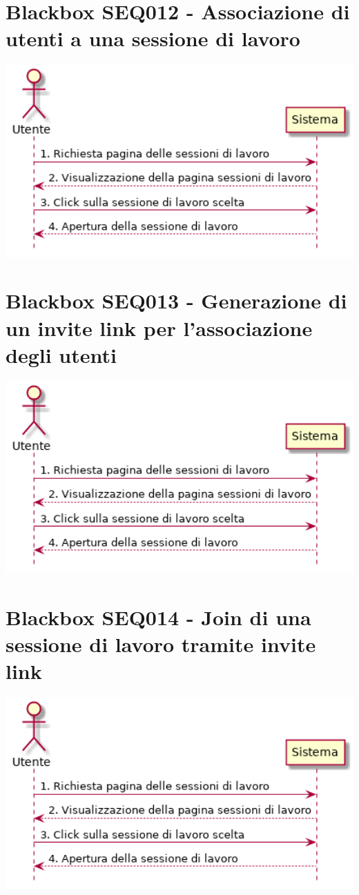 \documentclass[../main.tex]{subfiles}
\begin{document}
\section{Blackbox SEQ012 - Associazione di utenti a una sessione di lavoro }
\figure[H]
\centering
\includegraphics[width=14cm]{capitoli/usecases_diagrams/diagrams/SEQ012.png}
\endfigure
\section{Blackbox SEQ013 - Generazione di un invite link per l'associazione degli utenti }
\figure[H]
\centering
\includegraphics[width=14cm]{capitoli/usecases_diagrams/diagrams/SEQ013.png}
\endfigure
\section{Blackbox SEQ014 - Join di una sessione di lavoro tramite invite link }
\figure[H]
\centering
\includegraphics[width=14cm]{capitoli/usecases_diagrams/diagrams/SEQ014.png}
\endfigure
\end{document}
